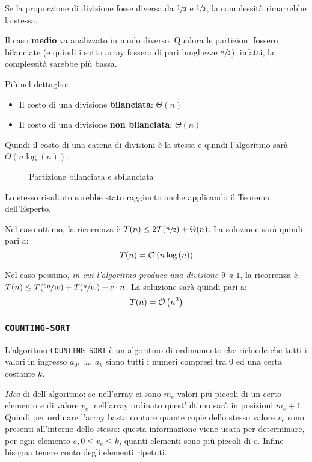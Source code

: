\documentclass[italian, 10pt]{article}
\begin{document}
Se la proporzione di divisione fosse diversa da \(\sfrac{1}{2}\) e \(\sfrac{1}{2}\), la complessità rimarrebbe la stessa.

\bigskip
Il caso \textbf{medio} va analizzato in modo diverso.
Qualora le partizioni fossero bilanciate (e quindi i sotto array fossero di pari lunghezze \(\sfrac{n}{2}\)), infatti, la complessità sarebbe più bassa.

Più nel dettaglio:

\begin{itemize}
  \item Il costo di una divisione \textbf{bilanciata}: \(\Theta(n)\)
  \item Il costo di una divisione \textbf{non bilanciata}: \(\Theta(n)\)
\end{itemize}

Quindi il costo di una catena di divisioni è la stessa e quindi l'algoritmo sarà \(\Theta(n \log{(n)})\).

\begin{figure}[htbp]
  \bigskip
  \centering
  \caption{Partizione bilanciata e sbilanciata}
  \label{fig:partizione-bilanciata-sbilanciata}
  \bigskip
\end{figure}

\bigskip
Lo stesso risultato sarebbe stato raggiunto anche applicando il Teorema dell'Esperto.

Nel caso ottimo, la ricorrenza è \(T(n) \leq 2T(\sfrac{n}{2}) + \Theta(n)\).
La soluzione sarà quindi pari a: \[ T(n) = \mathcal{O}\left(n \log{(n)}\right) \]

Nel caso pessimo, \textit{in cui l'algoritmo produce una divisione \(9\) a \(1\)}, la ricorrenza è \(T(n) \leq T(\sfrac{9n}{10}) + T(\sfrac{n}{10}) + c \cdot n\).
La soluzione sarà quindi pari a: \[ T(n) = \mathcal{O}\left(n^2\right) \]

\subsubsection{\texttt{COUNTING-SORT}}

L'algoritmo \texttt{COUNTING-SORT} è un algoritmo di ordinamento che richiede che tutti i valori in ingresso \(a_0,\, \ldots,\, a_k\) siano tutti i numeri compresi tra \(0\) ed una certa costante \(k\).

\textit{Idea} di dell'algoritmo:
se nell'array ci sono \(m_e\) valori più piccoli di un certo elemento \(e\) di valore \(v_e\), nell'array ordinato quest'ultimo sarà in posizioni \(m_e + 1\).
Quindi per ordinare l'array basta contare quante copie dello stesso valore \(v_e\) sono presenti all'interno dello stesso: questa informazione viene usata per determinare, per ogni elemento \(e, 0 \leq v_e \leq k\), quanti elementi sono più piccoli di \(e\).
Infine bisogna tenere conto degli elementi ripetuti.
\end{document}
